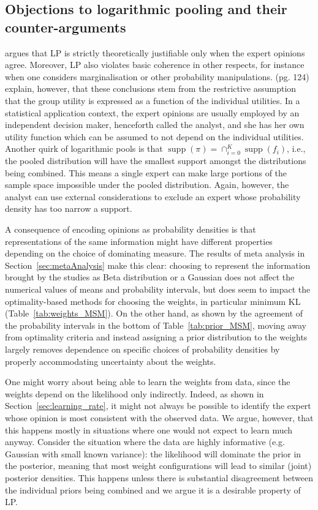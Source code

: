 \documentclass[12pt]{article}
\DeclareMathOperator\supp{supp}
\begin{document}
\subsection{Objections to logarithmic pooling and their counter-arguments}

\textcite{West1984} argues that LP is strictly theoretically justifiable only when the expert opinions agree.
Moreover, LP also violates basic coherence in other respects, for instance when one considers marginalisation or other probability manipulations. 
\textcite{Genest1986B} (pg. 124) explain, however, that these conclusions stem from the restrictive assumption that the group utility is expressed as a function of the individual utilities.
In a statistical application context, the expert opinions are usually employed by an independent decision maker, henceforth called the analyst, and she has her own utility function which can be assumed to not depend on the individual utilities.
Another quirk of logarithmic pools is that $\supp(\pi) = \cap_{i=0}^K \supp(f_i)$, i.e., the pooled distribution will have the smallest support amongst the distributions being combined.
This means a single expert can make large portions of the sample space impossible under the pooled distribution.
Again, however, the analyst can use external considerations to exclude an expert whose probability density has too narrow a support.

A consequence of encoding opinions as probability densities is that representations of the same information might have different properties depending on the choice of dominating measure.
The results of meta analysis in Section~\ref{sec:metaAnalysis} make this clear: choosing to represent the information brought by the studies as Beta distribution or a Gaussian does not affect the numerical values of means and probability intervals, but does seem to impact the optimality-based methods for choosing the weights, in particular minimum KL  (Table~\ref{tab:weights_MSM}).
On the other hand, as shown by the agreement of the probability intervals in the bottom of Table~\ref{tab:prior_MSM}, moving away from optimality criteria and instead assigning a prior distribution to the weights largely removes dependence on specific choices of probability densities by properly accommodating uncertainty about the weights.

One might worry about being able to learn the weights from data, since the weights depend on the likelihood only indirectly.
Indeed, as shown in Section~\ref{sec:learning_rate}, it might not always be possible to identify the expert whose opinion is most consistent with the observed data.
We argue, however, that this happens mostly in situations where one would not expect to learn much anyway.
Consider the situation where the data are highly informative (e.g. Gaussian with small known variance): the likelihood will dominate the prior in the posterior, meaning that most weight configurations will lead to similar (joint) posterior densities.
This happens unless there is substantial disagreement between the individual priors being combined and we argue it is a desirable property of LP.
\end{document}
